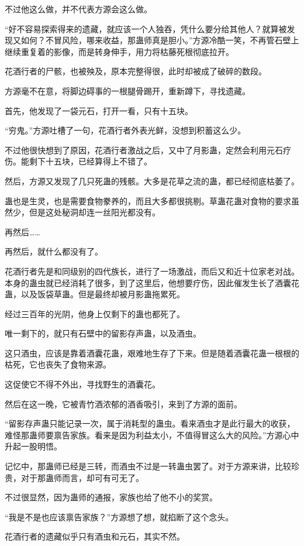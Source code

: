 \begin{this_body}
不过他这么做，并不代表方源会这么做。

“好不容易探索得来的遗藏，就应该一个人独吞，凭什么要分给其他人？就算被发现又如何？不冒风险，哪来收益，那蛊师真是胆小。”方源冷酷一笑，不再管石壁上继续重复着的影像，而是转身伸手，用力将枯藤死根彻底拉开。

花酒行者的尸骸，也被殃及，原本完整得很，此时却被成了破碎的数段。

方源毫不在意，将脚边碍事的一根腿骨踢开，重新蹲下，寻找遗藏。

首先，他发现了一袋元石，打开一看，只有十五块。

“穷鬼。”方源吐槽了一句，花酒行者外表光鲜，没想到积蓄这么少。

不过他很快想到了原因，花酒行者激战之后，又中了月影蛊，定然会利用元石疗伤。能剩下十五块，已经算得上不错了。

然后，方源又发现了几只死蛊的残骸。大多是花草之流的蛊，都已经彻底枯萎了。

蛊也是生灵，也是需要食物豢养的，而且大多都很挑剔。草蛊花蛊对食物的要求虽然少，但是这处秘洞却连一丝阳光都没有。

再然后……

再然后，就什么都没有了。

花酒行者先是和同级别的四代族长，进行了一场激战，而后又和近十位家老对战。本身的蛊虫就已经消耗了很多，到了这里后，他想要疗伤，因此催发生长了酒囊花蛊，以及饭袋草蛊。但是最终却被月影蛊拖累死。

经过三百年的光阴，他身上仅剩下的蛊也都死了。

唯一剩下的，就只有石壁中的留影存声蛊，以及酒虫。

这只酒虫，应该是靠着酒囊花蛊，艰难地生存了下来。但是随着酒囊花蛊一根根的枯死，它也丧失了食物来源。

这促使它不得不外出，寻找野生的酒囊花。

然后在这一晚，它被青竹酒浓郁的酒香吸引，来到了方源的面前。

“留影存声蛊只能记录一次，属于消耗型的蛊虫。看来酒虫才是此行最大的收获，难怪那蛊师要禀告家族。看来是因为利益太小，不值得冒这么大的风险。”方源心中升起一股明悟。

记忆中，那蛊师已经是三转，而酒虫不过是一转蛊虫罢了。对于方源来讲，比较珍贵，对于那蛊师而言，却可有可无了。

不过很显然，因为蛊师的通报，家族也给了他不小的奖赏。

“我是不是也应该禀告家族？”方源想了想，就掐断了这个念头。

花酒行者的遗藏似乎只有酒虫和元石，其实不然。


\end{this_body}
